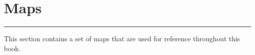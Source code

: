 \chapter{Maps}
\rule{\textwidth}{0.5pt}    %
\thispagestyle{fancy}

This section contains a set of maps that are used for reference throughout this book.